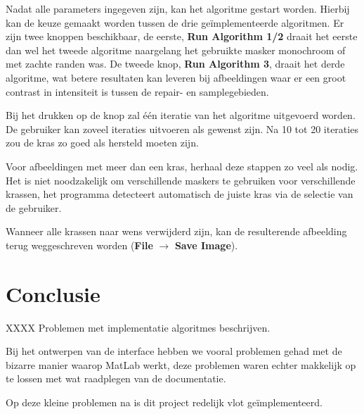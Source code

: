 \documentclass[a4paper,12pt]{article}
\begin{document}
Nadat alle parameters ingegeven zijn, kan het algoritme gestart worden.
Hierbij kan de keuze gemaakt worden tussen de drie ge\"implementeerde
algoritmen. Er zijn twee knoppen beschikbaar, de eerste, 
\textbf{Run Algorithm 1/2} draait het eerste dan wel het tweede algoritme
naargelang het gebruikte masker monochroom of met zachte randen was. De tweede
knop, \textbf{Run Algorithm 3}, draait het derde algoritme, wat betere
resultaten kan leveren bij afbeeldingen waar er een groot contrast in
intensiteit is tussen de repair- en samplegebieden.

Bij het drukken op de knop zal \'e\'en iteratie van het algoritme uitgevoerd
worden. De gebruiker kan zoveel iteraties uitvoeren als gewenst zijn. Na 10 tot
20 iteraties zou de kras zo goed als hersteld moeten zijn.

Voor afbeeldingen met meer dan een kras, herhaal deze stappen zo veel als
nodig. Het is niet noodzakelijk om verschillende maskers te gebruiken voor
verschillende krassen, het programma detecteert automatisch de juiste kras via
de selectie van de gebruiker.

Wanneer alle krassen naar wens verwijderd zijn, kan de resulterende afbeelding
terug weggeschreven worden (\textbf{File} $\to$ \textbf{Save Image}).

\section{Conclusie}
\todo{}
XXXX Problemen met implementatie algoritmes beschrijven.

Bij het ontwerpen van de interface hebben we vooral problemen gehad met de
bizarre manier waarop MatLab werkt, deze problemen waren echter makkelijk op te
lossen met wat raadplegen van de documentatie.

Op deze kleine problemen na is dit project redelijk vlot ge\"implementeerd.


  
\end{document}
